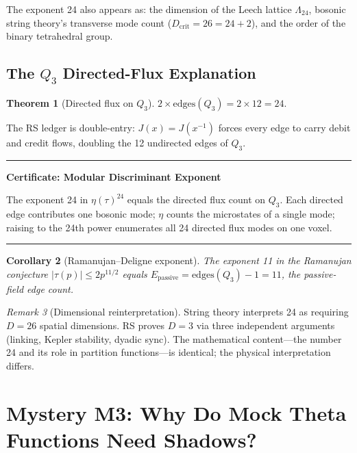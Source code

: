 \documentclass[11pt]{article}
\def\leanverified{}
\def\Jcost{J}
\theoremstyle{plain}
\newtheorem{theorem}{Theorem}[section]
\newtheorem{corollary}[theorem]{Corollary}
\theoremstyle{definition}
\theoremstyle{remark}
\newtheorem{remark}[theorem]{Remark}
\newenvironment{keyresult}[1][]
  {\begin{center}\begin{minipage}{0.92\textwidth}\hrule\vspace{0.5em}\textbf{#1}\par\vspace{0.3em}}
  {\vspace{0.5em}\hrule\end{minipage}\end{center}\vspace{0.5em}}
\newcommand{\leanverified}{\textsuperscript{\textnormal{[\textsc{Lean}]}}}
\newcommand{\Jcost}{J}
\begin{document}
The exponent 24 also appears as:
the dimension of the Leech lattice $\Lambda_{24}$,
bosonic string theory's transverse mode count ($D_{\text{crit}} = 26 = 24 + 2$),
and the order of the binary tetrahedral group.

\subsection[The Q3 Directed-Flux Explanation]{The $Q_3$ Directed-Flux Explanation}

\begin{theorem}[Directed flux on $Q_3$]\leanverified\label{thm:24}
$2 \times \mathrm{edges}(Q_3) = 2 \times 12 = 24.$
\end{theorem}

The RS ledger is double-entry: $\Jcost(x) = \Jcost(x^{-1})$ forces every edge
to carry debit and credit flows, doubling the 12 undirected edges of $Q_3$.

\begin{keyresult}[Certificate: Modular Discriminant Exponent\leanverified]
The exponent 24 in $\eta(\tau)^{24}$ equals the directed flux count on $Q_3$.
Each directed edge contributes one bosonic mode; $\eta$ counts the
microstates of a single mode; raising to the 24th power enumerates
all 24 directed flux modes on one voxel.
\end{keyresult}

\begin{corollary}[Ramanujan--Deligne exponent]\leanverified\label{cor:deligne}
The exponent 11 in the Ramanujan conjecture $|\tau(p)| \le 2p^{11/2}$
equals $E_{\mathrm{passive}} = \mathrm{edges}(Q_3) - 1 = 11$,
the passive-field edge count.
\end{corollary}

\begin{remark}[Dimensional reinterpretation]
String theory interprets 24 as requiring $D = 26$ spatial dimensions.
RS proves $D = 3$ via three independent arguments
(linking, Kepler stability, dyadic sync).
The mathematical content---the number 24 and its role in partition
functions---is identical; the physical interpretation differs.
\end{remark}

\section{Mystery M3: Why Do Mock Theta Functions Need Shadows?}
\label{sec:mock}
\end{document}
